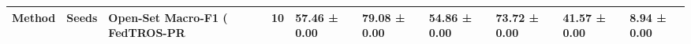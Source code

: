 \begin{tabular}{lrllllll}
\toprule
Method & Seeds & Open-Set Macro-F1 (%
\midrule
FedTROS-PR & 10 & 57.46 ± 0.00 & 79.08 ± 0.00 & 54.86 ± 0.00 & 73.72 ± 0.00 & 41.57 ± 0.00 & 8.94 ± 0.00 \\
\bottomrule
\end{tabular}
